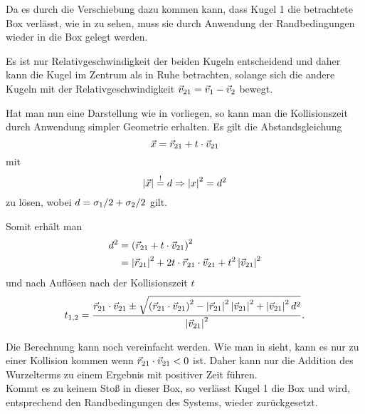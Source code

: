 

Da es durch die Verschiebung dazu kommen kann, dass Kugel 1 die betrachtete Box verlässt, wie in  zu sehen, muss sie durch Anwendung der Randbedingungen wieder in die Box gelegt werden.



Es ist nur Relativgeschwindigkeit der beiden Kugeln entscheidend und daher kann die Kugel im Zentrum als in Ruhe betrachten, solange sich die andere Kugeln mit der Relativgeschwindigkeit $\vec{v}_{21}=\vec{v}_1-\vec{v}_2$ bewegt.
 


Hat man nun eine Darstellung wie in  vorliegen, so kann man die Kollisionszeit durch Anwendung simpler Geometrie erhalten.
Es gilt die Abstandsgleichung 
\begin{equation}
	\vec{x} = \vec{r}_{21} + t\cdot\vec{v}_{21}
\end{equation}
mit 
\begin{equation}
	\left|\vec{x}\right| \overset{!}{=} d \Rightarrow \left|x\right|^2 = d^2
\end{equation}
zu lösen, wobei $d=\sigma_1/2 + \sigma_2/2$ gilt.

Somit erhält man
\begin{align}
	d^2	&= \left(\vec{r}_{21} + t\cdot\vec{v}_{21} \right)^2 \\
			&= \left|\vec{r}_{21}\right|^2 + 2t\cdot\vec{r}_{21}\cdot\vec{v}_{21} + t^2\left|\vec{v}_{21}\right|^2
\end{align}
und nach Auflösen nach der Kollisionszeit $t$
\begin{equation}
	t_{1,2}=\frac{\vec{r}_{21}\cdot\vec{v}_{21} \pm \sqrt{\left(\vec{r}_{21}\cdot\vec{v}_{21}\right)^2 - \left|\vec{r}_{21}\right|^2\left|\vec{v}_{21}\right|^2 + \left|\vec{v}_{21}\right|^2d^2}}{\left|\vec{v}_{21}\right|^2}.
\end{equation}

Die Berechnung kann noch vereinfacht werden. Wie man in  sieht, kann es nur zu einer Kollision kommen wenn $\vec{r}_{21}\cdot\vec{v}_{21} < 0$ ist. Daher kann nur die Addition des Wurzelterms zu einem Ergebnis mit positiver Zeit führen.\\
Kommt es zu keinem Stoß in dieser Box, so verlässt Kugel 1 die Box und wird, entsprechend den Randbedingungen des Systems, wieder zurückgesetzt.